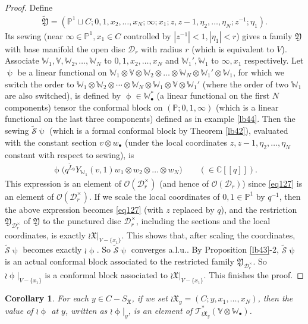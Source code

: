 \documentclass[12pt,a4paper,notitlepage]{report}
\theoremstyle{definition}
\theoremstyle{plain}
\newtheorem{co}[df]{Corollary}
\newcommand{\fk}{\mathfrak}
\newcommand{\mc}{\mathcal}
\newcommand{\wtd}{\widetilde}
\newcommand{\scr}{\mathscr}
\newcommand{\SX}{S_{\fk X}}
\newcommand{\blt}{\bullet}
\newcommand{\Vbb}{\mathbb V}
\newcommand{\Wbb}{\mathbb W}
\newcommand{\Cbb}{\mathbb C}
\newcommand{\Pbb}{\mathbb P}
\numberwithin{equation}{section}
\begin{document}
\begin{proof}
Define
\begin{align*}
\wtd{\fk Y}=(\Pbb^1\sqcup C;0,1,x_2,\dots,x_N;\infty;x_1;z,z-1,\eta_2,\dots,\eta_N;z^{-1};\eta_1).
\end{align*}
Its sewing (near $\infty\in\Pbb^1,x_1\in C$ controlled by $|z^{-1}|<1,|\eta_1|<r$) gives a family $\fk Y$ with base manifold the open disc $\mc D_r$ with radius $r$ (which is equivalent to $V$). Associate $\Wbb_1,\Vbb,\Wbb_2,\dots,\Wbb_N$ to $0,1,x_2,\dots,x_N$ and $\Wbb_1',\Wbb_1$ to $\infty,x_1$ respectively. Let $\uppsi$ be a linear functional on $\Wbb_1\otimes\Vbb\otimes\Wbb_2\otimes\dots\otimes\Wbb_N\otimes \Wbb_1'\otimes \Wbb_1$, for which we switch the order to $\Wbb_1\otimes\Wbb_2\otimes\cdots\otimes\Wbb_N\otimes \Wbb_1\otimes\Vbb\otimes\Wbb_1'$ (where the order of two $\Wbb_1$ are also switched), is defined by $\upphi\in\Wbb_\blt^*$ (a linear functional on the first $N$ components) tensor the conformal block on $(\Pbb;0,1,\infty)$ (which is a linear functional on the last three components) defined as in example \ref{lb44}. Then the sewing $\wtd{\mc S}\uppsi$ (which is a formal conformal block by Theorem \ref{lb42}), evaluated with the constant section $v\otimes w_\blt$ (under the local coordinates $z,z-1,\eta_2,\dots,\eta_N$ constant with respect to sewing), is
\begin{align*}
\upphi\big(q^{\wtd L_0}Y_{\Wbb_1}(v,1)w_1\otimes w_2\otimes \dots\otimes w_N\big)\qquad (\in\Cbb[[q]]).
\end{align*}
This expression is an element of $\scr O(\mc D_r^\times)$ (and hence of $\scr O(\mc D_r)$) since \eqref{eq127} is an element of $\scr O(\mc D_r^\times)$. If we scale the local coordinates of $0,1\in\Pbb^1$ by $q^{-1}$, then the above expression becomes \eqref{eq127} (with $z$ replaced by $q$), and the restriction $\fk Y_{\mc D_r^\times}$ of $\fk Y$ to the punctured disc $\mc D_r^\times$, including the sections and the local coordinates, is exactly  $\wr\fk X|_{V-\{x_1\}}$. This shows that, after scaling the coordinates, $\wtd {\mc S}\uppsi$ becomes exactly $\wr\upphi$. So $\wtd {\mc S}\uppsi$ converges a.l.u..    By Proposition \ref{lb43}-2, $\wtd{\mc S}\uppsi$ is an actual conformal block associated to the restricted family $\fk Y_{\mc D_r^\times}$. So $\wr\upphi|_{V-\{x_1\}}$ is a conformal block associated to $\wr\fk X|_{V-\{x_1\}}$. This finishes the proof. 
\end{proof}



\begin{co}\label{lb127}
For each $y\in C-\SX$, if we set $\wr\fk X_y=(C;y,x_1,\dots,x_N)$, then the value of $\wr\upphi$ at $y$, written as $\wr\upphi|_y$, is an element of $\scr T_{\wr\fk X_y}^*(\Vbb\otimes\Wbb_\blt)$.
\end{co}
\end{document}
